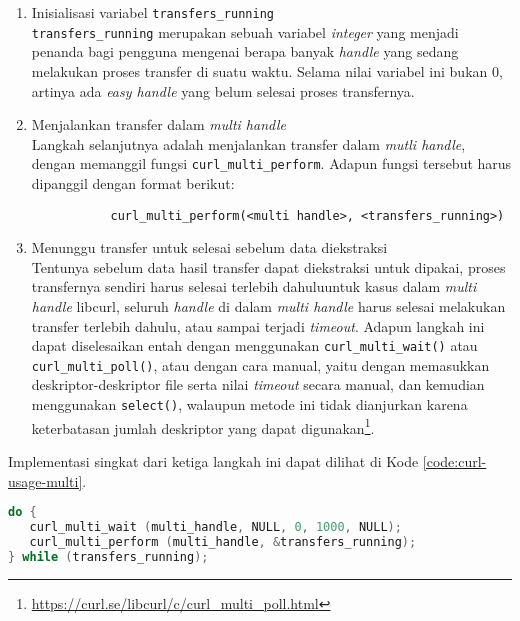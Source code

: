 \begin{enumerate}
	\item Inisialisasi variabel \verb|transfers_running|\\
	\verb|transfers_running| merupakan sebuah variabel \textit{integer} yang menjadi penanda bagi pengguna mengenai berapa banyak \textit{handle} yang sedang melakukan proses transfer di suatu waktu. Selama nilai variabel ini bukan 0, artinya ada \textit{easy handle} yang belum selesai proses transfernya.
	\item Menjalankan transfer dalam \textit{multi handle}\\
	Langkah selanjutnya adalah menjalankan transfer dalam \textit{mutli handle}, dengan memanggil fungsi \verb|curl_multi_perform|. Adapun fungsi tersebut harus dipanggil dengan format berikut:

\begin{verbatim}
           curl_multi_perform(<multi handle>, <transfers_running>)
\end{verbatim}

	\item Menunggu transfer untuk selesai sebelum data diekstraksi\\
	Tentunya sebelum data hasil transfer dapat diekstraksi untuk dipakai, proses transfernya sendiri harus selesai terlebih dahulu\textemdash untuk kasus dalam \textit{multi handle} libcurl, seluruh \textit{handle} di dalam \textit{multi handle} harus selesai melakukan transfer terlebih dahulu, atau sampai terjadi \textit{timeout}. Adapun langkah ini dapat diselesaikan entah dengan menggunakan \verb|curl_multi_wait()| atau \verb|curl_multi_poll()|, atau dengan cara manual, yaitu dengan memasukkan deskriptor-deskriptor file serta nilai \textit{timeout} secara manual, dan kemudian menggunakan \verb|select()|, walaupun metode ini tidak dianjurkan karena keterbatasan jumlah deskriptor yang dapat digunakan\footnote{\href{https://curl.se/libcurl/c/curl\_multi\_poll.html}{https://curl.se/libcurl/c/curl\_multi\_poll.html}}.
\end{enumerate}
\noindent
Implementasi singkat dari ketiga langkah ini dapat dilihat di Kode \ref{code:curl-usage-multi}.

\begin{lstlisting}[language=C, caption=Loop sederhana dari pengunaan \textit{multi handle} curl, label=code:curl-usage-multi]
do {
   curl_multi_wait (multi_handle, NULL, 0, 1000, NULL);
   curl_multi_perform (multi_handle, &transfers_running);
} while (transfers_running);
\end{lstlisting}

